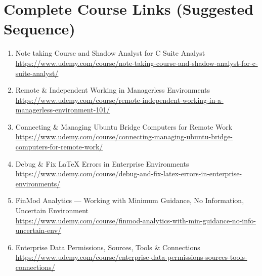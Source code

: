 \documentclass[12pt]{article}
\begin{document}
	\section*{Complete Course Links (Suggested Sequence)}
	
	\begin{enumerate}[label=\textbf{Course \arabic*:}]
		
		\item Note taking Course and Shadow Analyst for C Suite Analyst\\
		\href{https://www.udemy.com/course/note-taking-course-and-shadow-analyst-for-c-suite-analyst/}
		{https://www.udemy.com/course/note-taking-course-and-shadow-analyst-for-c-suite-analyst/}
		
		\item Remote \& Independent Working in Managerless Environments \\
		\href{https://www.udemy.com/course/remote-independent-working-in-a-managerless-environment-101/}
		{https://www.udemy.com/course/remote-independent-working-in-a-managerless-environment-101/}
		
		\item Connecting \& Managing Ubuntu Bridge Computers for Remote Work\\
		\href{https://www.udemy.com/course/connecting-managing-ubuntu-bridge-computers-for-remote-work/}
		{https://www.udemy.com/course/connecting-managing-ubuntu-bridge-computers-for-remote-work/}
		
		\item Debug \& Fix LaTeX Errors in Enterprise Environments\\
		\href{https://www.udemy.com/course/debug-and-fix-latex-errors-in-enterprise-environments/?referralCode=A542C7DF75B5FD6FED78}
		{https://www.udemy.com/course/debug-and-fix-latex-errors-in-enterprise-environments/}
		
		\item FinMod Analytics — Working with Minimum Guidance, No Information, Uncertain Environment\\
		\href{https://www.udemy.com/course/finmod-analytics-with-min-guidance-no-info-uncertain-env/?referralCode=3E16FCA1C75B45770B50}
		{https://www.udemy.com/course/finmod-analytics-with-min-guidance-no-info-uncertain-env/}
		
		\item Enterprise Data Permissions, Sources, Tools \& Connections\\
		\href{https://www.udemy.com/course/enterprise-data-permissions-sources-tools-connections/?referralCode=B3C3EE8FF34BB747F766}
		{https://www.udemy.com/course/enterprise-data-permissions-sources-tools-connections/}
		

\end{enumerate}
\end{document}
